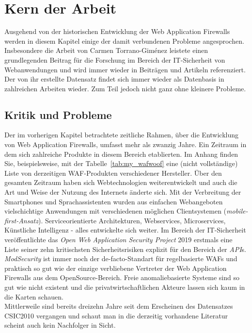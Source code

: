 \chapter{Kern der Arbeit}

Ausgehend von der historischen Entwicklung der Web Application Firewalls werden in diesem Kapitel einige der damit verbundenen Probleme angesprochen. Insbesondere die Arbeit von Carmen Torrano-Giménez leistete einen grundlegenden Beitrag für die Forschung im Bereich der IT-Sicherheit von Webanwendungen und wird immer wieder in Beiträgen und Artikeln referenziert. Der von ihr erstellte Datensatz findet sich immer wieder als Datenbasis in zahlreichen Arbeiten wieder. Zum Teil jedoch nicht ganz ohne kleinere Probleme. 

\section{Kritik und Probleme}
\label{sec:Probleme}

Der im vorherigen Kapitel betrachtete zeitliche Rahmen, über die Entwicklung von Web Application Firewalls, umfasst mehr als zwanzig Jahre. Ein Zeitraum in dem sich zahlreiche Produkte in diesem Bereich etablierten. Im Anhang finden Sie, beispielsweise, mit der Tabelle~\ref{tab:my_wafwoof} eine (nicht vollständige) Liste von derzeitigen WAF-Produkten verschiedener Hersteller. Über den gesamten Zeitraum haben sich Webtechnologien weiterentwickelt und auch die Art und Weise der Nutzung des Internets änderte sich. Mit der Verbreitung der Smartphones und Sprachassistenten wurden aus einfachen Webangeboten vielschichtige Anwendungen mit verschiedenen möglichen Clientsystemen (\emph{mobile-first-Ansatz}). Serviceorientierte Architekturen, Webservices, Microservices, Künstliche Intelligenz - alles entwickelte sich weiter. Im Bereich der IT-Sicherheit veröffentlichte das \emph{Open Web Application Security Project} 2019 erstmals eine Liste seiner zehn kritischsten Sicherheitsrisiken explizit für den Bereich der \emph{API}s. \emph{ModSecurity} ist immer noch der de-facto-Standart für regelbasierte WAFs und praktisch so gut wie der einzige verbliebene Vertreter der Web Application Firewalls aus dem OpenSource-Bereich. Freie anomaliebasierte Systeme sind so gut wie nicht existent und die privatwirtschaftlichen Akteure lassen sich kaum in die Karten schauen. \\
Mittlerweile sind bereits dreizehn Jahre seit dem Erscheinen des Datensatzes CSIC2010 vergangen und schaut man in die derzeitig vorhandene Literatur scheint auch kein Nachfolger in Sicht. \\\\

